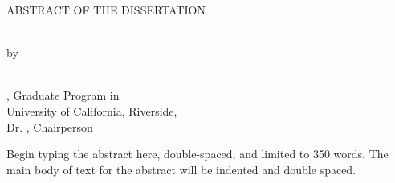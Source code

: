\begin{center}

ABSTRACT OF THE DISSERTATION
\\
\null

\Title
\\


by
\\


\Author
\\
\null

\Degree, Graduate Program in \FieldofStudy \\
University of California, Riverside, \ConferralDate \\
Dr. \CommChair, Chairperson
\\
\null

\end{center}
\justifying

Begin typing the abstract here, double-spaced, and limited to 350 words.
The main body of text for the abstract will be indented and double spaced.
